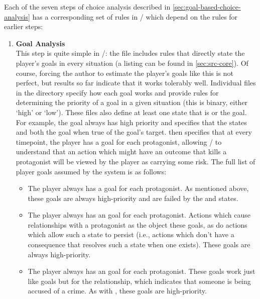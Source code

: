 Each of the seven steps of choice analysis described in \cref{sec:goal-based-choice-analysis} has a corresponding set of rules in \dunyazad/ which depend on the rules for earlier steps:
%
\begin{enumerate}[leftmargin=1.4em]
\setlength{\parindent}{1.5em}
\item %
\textbf{Goal Analysis} \\
%
This step is quite simple in \dunyazad/: the file  includes rules that directly state the player's goals in every situation (a listing can be found in \cref{sec:src-core}).
%
Of course, forcing the author to estimate the player's goals like this is not perfect, but results so far indicate that it works tolerably well.
%
Individual files in the  directory specify how each goal works and provide rules for determining the priority of a goal in a given situation (this is binary, either `high' or `low').
%
These files also define at least one state that is    or  the goal.
%
For example, the  goal always has high priority and specifies that the states  and  both  the goal when true of the goal's target.
%
 then specifies that at every timepoint, the player has a  goal for each protagonist, allowing \dunyazad/ to understand that an action which might have an outcome that kills a protagonist will be viewed by the player as carrying some risk.
%
The full list of player goals assumed by the system is as follows:
%
\begin{itemize}
\item The player always has a  goal for each protagonist. As mentioned above, these goals are always high-priority and are failed by the  and  states.
\item The player always has an  goal for each protagonist. Actions which cause  relationships with a protagonist as the object  these goals, as do actions which allow such a state to persist (i.e., actions which don't have a consequence that resolves such a state when one exists). These goals are always high-priority.
\item The player always has an  goal for each protagonist. These goals work just like  goals but for the  relationship, which indicates that someone is being accused of a crime. As with , these goals are high-priority.

\end{itemize}
\end{enumerate}
